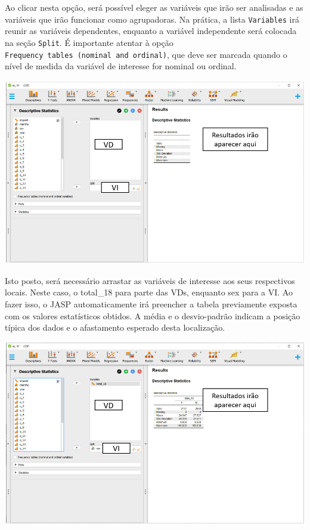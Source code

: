 \documentclass[
]{book}
\begin{document}
Ao clicar nesta opção, será possível eleger as variáveis que irão ser analisadas e as variáveis que irão funcionar como agrupadoras. Na prática, a lista \texttt{Variables} irá reunir as variáveis dependentes, enquanto a variável independente será colocada na seção \texttt{Split}. É importante atentar à opção \texttt{Frequency\ tables\ (nominal\ and\ ordinal)}, que deve ser marcada quando o nível de medida da variável de interesse for nominal ou ordinal.

\includegraphics{./img/jasp_descriptives2.png}

Isto posto, será necessário arrastar as variáveis de interesse aos seus respectivos locais. Neste caso, o total\_18 para parte das VDs, enquanto sex para a VI. Ao fazer isso, o JASP automaticamente irá preencher a tabela previamente exposta com os valores estatísticos obtidos. A média e o desvio-padrão indicam a posição típica dos dados e o afastamento esperado desta localização.

\includegraphics{./img/cap_testet_tabela_descritiva.png}
\end{document}
